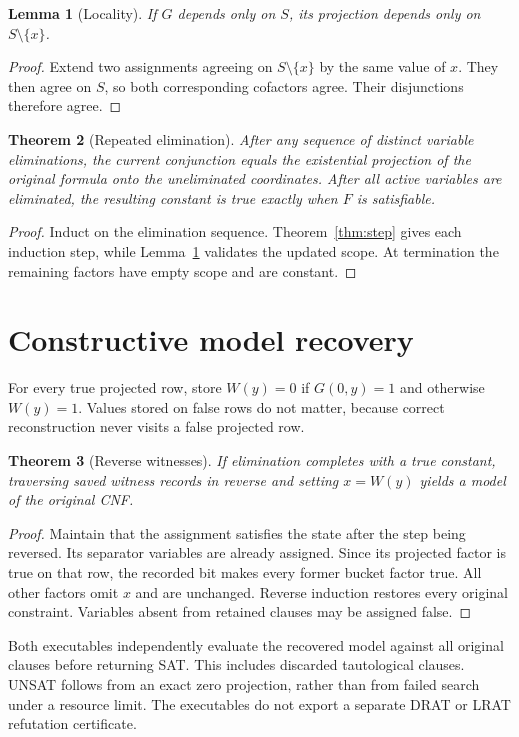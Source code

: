 \documentclass[11pt]{article}
\newtheorem{theorem}{Theorem}[section]
\newtheorem{lemma}[theorem]{Lemma}
\begin{document}
\begin{lemma}[Locality]\label{lem:locality}
If $G$ depends only on $S$, its projection depends only on $S\setminus\{x\}$.
\end{lemma}
\begin{proof}
Extend two assignments agreeing on $S\setminus\{x\}$ by the same value
of $x$. They then agree on $S$, so both corresponding cofactors agree.
Their disjunctions therefore agree.
\end{proof}

\begin{theorem}[Repeated elimination]\label{thm:repeat}
After any sequence of distinct variable eliminations, the current
conjunction equals the existential projection of the original formula
onto the uneliminated coordinates. After all active variables are
eliminated, the resulting constant is true exactly when $F$ is satisfiable.
\end{theorem}
\begin{proof}
Induct on the elimination sequence. Theorem~\ref{thm:step} gives each
induction step, while Lemma~\ref{lem:locality} validates the updated scope.
At termination the remaining factors have empty scope and are constant.
\end{proof}

\section{Constructive model recovery}
For every true projected row, store $W(y)=0$ if $G(0,y)=1$ and otherwise
$W(y)=1$. Values stored on false rows do not matter, because correct
reconstruction never visits a false projected row.

\begin{theorem}[Reverse witnesses]\label{thm:recover}
If elimination completes with a true constant, traversing saved witness
records in reverse and setting $x=W(y)$ yields a model of the original CNF.
\end{theorem}
\begin{proof}
Maintain that the assignment satisfies the state after the step being
reversed. Its separator variables are already assigned. Since its projected
factor is true on that row, the recorded bit makes every former bucket
factor true. All other factors omit $x$ and are unchanged. Reverse induction
restores every original constraint. Variables absent from retained clauses
may be assigned false.
\end{proof}
Both executables independently evaluate the recovered model against
all original clauses before returning SAT. This includes discarded
tautological clauses. UNSAT follows from an exact zero projection, rather
than from failed search under a resource limit.
The executables do not export a separate DRAT or LRAT refutation certificate.
\end{document}
